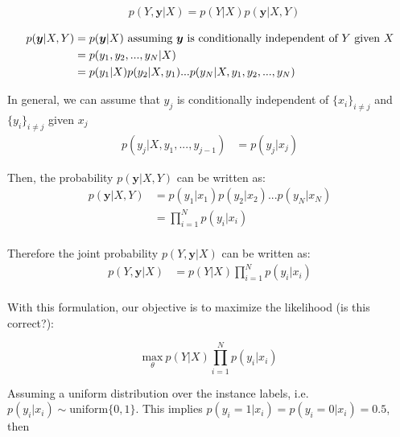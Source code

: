 \documentclass[11pt]{article}
\begin{document}
    \begin{align*}
        &p(Y,\bm{y}\vert X) = p(Y\vert X)p(\bm{y}\vert X,Y)
    \end{align*}


    \begin{align*}
        p(\bm{y}\vert X,Y) &= p(\bm{y}\vert X)  \text{ assuming $\bm{y}$ is conditionally independent of $Y$ given $X$}\\
        &= p(y_1, y_2,...,y_N \vert X) \\
        &=p(y_1\vert X)p(y_2\vert X, y_1)...p(y_N\vert X, y_1, y_2,...,y_N) \notag
    \end{align*}



    In general, we can assume that $y_j$ is conditionally independent of $\{x_i\}_{i\neq j}$ and $\{y_i\}_{i\neq j}$ given $x_j$
    \begin{align*}
        p(y_j\vert X, y_1,...,y_{j-1}) &= p(y_j\vert x_j)
    \end{align*}

    Then, the probability $p(\bm{y}\vert X,Y)$ can be written as:
    \begin{align*}
        p(\bm{y}\vert X,Y) &= p(y_1\vert x_1)p(y_2\vert x_2)...p(y_N\vert x_N)\\
        &= \prod_{i=1}^{N} p(y_i\vert x_i)\\
    \end{align*}

    Therefore the joint probability $p(Y,\bm{y}\vert X)$ can be written as:
    \begin{align*}
        p(Y,\bm{y}\vert X) &= p(Y\vert X)\prod_{i=1}^{N} p(y_i\vert x_i)\\
    \end{align*}

    With this formulation, our objective is to maximize the likelihood (is this correct?):

    $$\underset{\theta}{\text{max}} \ p(Y\vert X)\prod_{i=1}^{N} p(y_i\vert x_i)$$

    Assuming a uniform distribution over the instance labels, i.e. $p(y_i \vert x_i) \sim \text{uniform}\{0,1\}$. This implies $p(y_i=1 \vert x_i) = p(y_i=0 \vert x_i) = 0.5$, then
\end{document}
